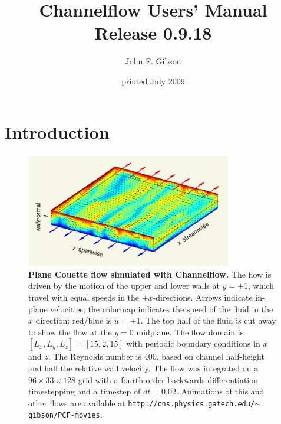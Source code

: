 \documentclass{article}[12pt]
\begin{document}
\renewcommand{\arraystretch}{1.5}

\title{Channelflow Users' Manual\\Release 0.9.18}
\author{John F. Gibson}
\date{printed July 2009}
\maketitle


\tableofcontents
\thispagestyle{empty}
\pagebreak
\indent


\pagestyle{plain}

\section{Introduction}

\begin{figure}
\centering
\includegraphics[width=0.8\textwidth]{ubigbox100}
\caption{{\bf Plane Couette flow simulated with Channelflow.} The flow is
driven by the motion of the upper and lower walls at $y = \pm 1$,
which travel with equal speeds in the $\pm x$-directions. Arrows
indicate in-plane velocities; the colormap indicates the speed of the
fluid in the $x$ direction: red/blue is $u = \pm 1$. The top half of
the fluid is cut away to show the flow at the $y=0$ midplane. The flow
domain is $[L_x, L_y, L_z] = [15,2,15]$ with periodic boundary
conditions in $x$ and $z$. The Reynolds number is 400, based on
channel half-height and half the relative wall velocity. The flow was
integrated on a $96 \times 33 \times 128$ grid with a fourth-order
backwards differentiation timestepping and a timestep of $dt = 0.02$.
Animations of this and other flows are available at
{\tt http://cns.physics.gatech.edu/}$\sim${\tt gibson/PCF-movies}.
}
\label{fig:couette}
\end{figure}
\end{document}
